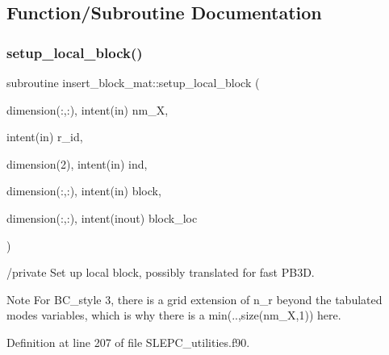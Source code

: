 \subsection{Function/\+Subroutine Documentation}
\mbox{\label{SLEPC__utilities_8f90_a711d6be49d3b1542ee3375bceb5b4e6d}} 
\subsubsection{\texorpdfstring{setup\+\_\+local\+\_\+block()}{setup\_local\_block()}}
{\footnotesize\ttfamily subroutine insert\+\_\+block\+\_\+mat\+::setup\+\_\+local\+\_\+block (\begin{DoxyParamCaption}\item[{dimension(\+:,\+:), intent(in)}]{nm\+\_\+X,  }\item[{intent(in)}]{r\+\_\+id,  }\item[{dimension(2), intent(in)}]{ind,  }\item[{dimension(\+:,\+:), intent(in)}]{block,  }\item[{dimension(\+:,\+:), intent(inout)}]{block\+\_\+loc }\end{DoxyParamCaption})}



/private Set up local block, possibly translated for fast P\+B3D. 

\begin{DoxyNote}{Note}
For B\+C\+\_\+style 3, there is a grid extension of n\+\_\+r beyond the tabulated modes variables, which is why there is a \textquotesingle{}min(..,size(nm\+\_\+\+X,1))\textquotesingle{} here. 
\end{DoxyNote}


Definition at line 207 of file S\+L\+E\+P\+C\+\_\+utilities.\+f90.

